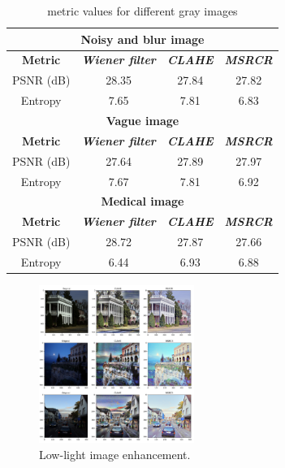 \documentclass[conference]{IEEEtran}
\begin{document}
\begin{table}[htbp]
\caption{metric values for different gray images}
\begin{center}
\begin{tabular}{|c|c|c|c|}
\hline
\multicolumn{4}{|c|}{\textbf{Noisy and blur image}} \\
\hline
\textbf{Metric} & \textbf{\textit{Wiener filter}}& \textbf{\textit{CLAHE}}& \textbf{\textit{MSRCR}} \\
\hline
PSNR (dB)& 28.35& 27.84& 27.82 \\
\hline
Entropy & 7.65 & 7.81 &6.83 \\
\hline
\multicolumn{4}{|c|}{\textbf{Vague image}} \\
\hline
\textbf{Metric} & \textbf{\textit{Wiener filter}}& \textbf{\textit{CLAHE}}& \textbf{\textit{MSRCR}} \\
\hline
PSNR (dB)& 27.64& 27.89& 27.97 \\
\hline
Entropy & 7.67 & 7.81 &6.92 \\
\hline
\multicolumn{4}{|c|}{\textbf{Medical image}} \\
\hline
\textbf{Metric} & \textbf{\textit{Wiener filter}}& \textbf{\textit{CLAHE}}& \textbf{\textit{MSRCR}} \\
\hline
PSNR (dB)& 28.72& 27.87& 27.66 \\
\hline
Entropy & 6.44 & 6.93 &6.88 \\
\hline
\end{tabular}
\label{tab1}
\end{center}
\end{table}

\begin{figure}[htbp]
\centerline{\includegraphics[width = 0.45\textwidth, height = 0.45\textwidth]{figure/collect.png}}
\caption{Low-light image enhancement.}
\label{fig6}
\end{figure}
\end{document}
